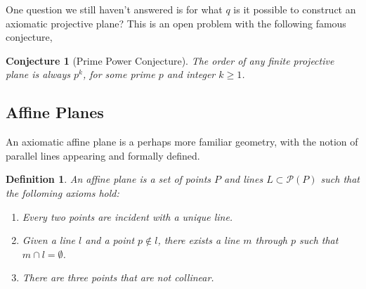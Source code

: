 \documentclass{article}
\newtheorem{definition}{Definition}
\newtheorem{conjecture}{Conjecture}
\newcommand{\PG}{\mathrm{PG}}
\begin{document}
One question we still haven't answered is for what \(q\) is it possible to construct an axiomatic projective plane? This is an open problem with the following famous conjecture,

\begin{conjecture}[Prime Power Conjecture]
  The order of any finite projective plane is always \(p^k\), for some prime \(p\) and integer \(k \geq 1\).
\end{conjecture}



\subsection{Affine Planes}

An axiomatic affine plane is a perhaps more familiar geometry, with the notion of parallel lines appearing and formally defined.

\begin{definition}

  An affine plane is a set of points \(P\) and lines \(L \subset \mathcal{P}(P)\) such that the folloming axioms hold:

  \begin{enumerate}[label=Axiom \arabic*.]
    \item Every two points are incident with a unique line.~\label{axiom:aff-1}
    \item Given a line \(l\) and a point \(p \notin l\), there exists a line \(m\) through \(p\) such that \(m \cap l = \emptyset\).~\label{axiom:aff-2}
    \item There are three points that are not collinear.~\label{axiom:aff-3}
  \end{enumerate}
\end{definition}
\end{document}
